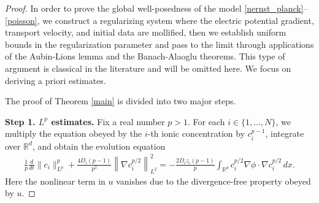 \documentclass[11pt,reqno]{amsart}
\newcommand{\R}{\mathbb R}
\begin{document}
\begin{proof}
In order to prove the global well-posedness of the model \eqref{nernst_planck}--\eqref{poisson}, we construct a regularizing system where the electric potential gradient, transport velocity, and initial data are mollified, then we establish uniform bounds in the regularization parameter and pass to the limit through applications of the Aubin-Lions lemma and the Banach-Alaoglu theorems. This type of argument is classical in the literature and will be omitted here. We focus on deriving a priori estimates.


The proof of Theorem \ref{main} is divided into two major steps.

{\bf{Step 1. $L^p$ estimates.}} Fix a real number $p > 1$. For each $i\in \{1,...,N\}$, we multiply the equation obeyed by the $i$-th ionic concentration by $c_i^{p-1}$, integrate over $\R^d$, and obtain the evolution equation 
\begin{align}\label{energyeqD}
\frac{1}{p} \frac{d}{dt} \|c_i\|_{L^p}^p + \frac{4D_i(p-1)}{p^2} \left\| \nabla c_i^{p/2} \right\|_{L^2}^2 = -\frac{2D_i z_i(p-1)}{p}\int_{\mathbb{R}^d} c_i^{p/2} \nabla\phi\cdot \nabla c_i^{p/2}\,dx.
\end{align}
Here the nonlinear term in $u$ vanishes due to the divergence-free property obeyed by $u$. 


\end{proof}
\end{document}
